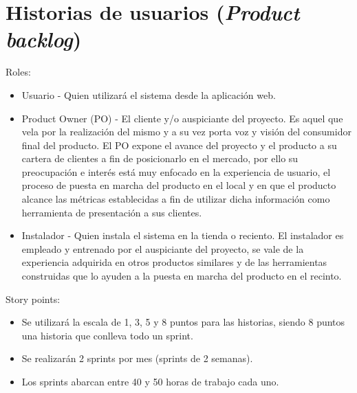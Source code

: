 \documentclass[11pt]{charter}
\begin{document}
\newpage

\section{Historias de usuarios (\textit{Product backlog})}
\label{sec:backlog}

Roles:
\begin{itemize}
\item Usuario - Quien utilizará el sistema desde la aplicación web.
\item Product Owner (PO) - El cliente y/o auspiciante del proyecto. Es aquel que vela por la realización del mismo y a su vez porta voz y visión del consumidor final del producto. El PO expone el avance del proyecto y el producto a su cartera de clientes a fin de posicionarlo en el mercado, por ello su preocupación e interés está muy enfocado en la experiencia de usuario, el proceso de puesta en marcha del producto en el local y en que el producto alcance las métricas establecidas a fin de utilizar dicha información como herramienta de presentación a sus clientes.
\item Instalador - Quien instala el sistema en la tienda o reciento. El instalador es empleado y entrenado por el auspiciante del proyecto, se vale de la experiencia adquirida en otros productos similares y de las herramientas construidas que lo ayuden a la puesta en marcha del producto en el recinto.
\end{itemize}

Story points:
\begin{itemize}
\item Se utilizará la escala de 1, 3, 5 y 8 puntos para las historias, siendo 8 puntos una historia que  conlleva todo un sprint.
\item Se realizarán 2 sprints por mes (sprints de 2 semanas).
\item Los sprints abarcan entre 40 y 50 horas de trabajo cada uno.
\end{itemize}
\end{document}
